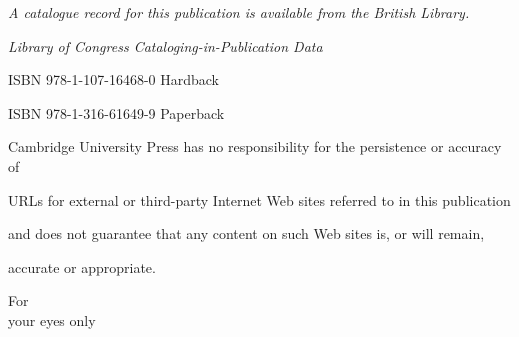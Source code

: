 \documentclass[prodtf]{EngC}
\numberwithin{equation}{chapter}
\numberwithin{figure}{chapter}
\numberwithin{table}{chapter}
\begin{document}
\begin{copyrightpage}
\textit{A catalogue record for this publication is available from the British Library.}\par{}\baselineskip

\textit{Library of Congress Cataloging-in-Publication Data}\par{}\baselineskip

ISBN 978-1-107-16468-0 Hardback\par
ISBN 978-1-316-61649-9 Paperback\par{}\baselineskip

Cambridge University Press has no responsibility for the persistence or accuracy of\par
URLs for external or third-party Internet Web sites referred to in this publication\par
 and does not guarantee that any content on such Web sites is, or will remain,\par
accurate or appropriate.
\end{copyrightpage}


\begin{dedication}
For\\
your eyes only
\end{dedication}


\tableofcontents

\cleardoublepage


\end{document}
